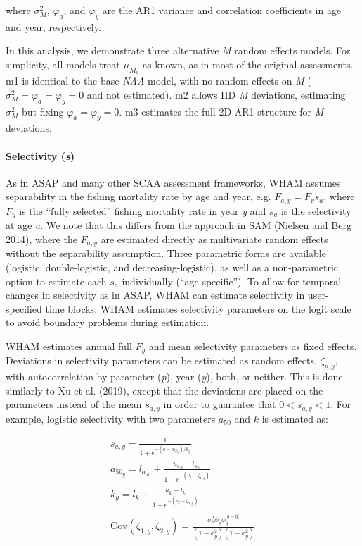 \documentclass[]{article}
\let\oldparagraph\paragraph
\renewcommand{\paragraph}[1]{\oldparagraph{#1}\mbox{}}
\begin{document}
where \(\sigma^2_M\), \(\varphi_a\), and \(\varphi_y\) are the AR1
variance and correlation coefficients in age and year, respectively.

In this analysis, we demonstrate three alternative \emph{M} random
effects models. For simplicity, all models treat \(\mu_{M_a}\) as known,
as in most of the original assessments. m1 is identical to the base
\emph{NAA} model, with no random effects on \emph{M}
(\(\sigma^2_M = \varphi_a = \varphi_y = 0\) and not estimated). m2
allows IID \emph{M} deviations, estimating \(\sigma^2_M\) but fixing
\(\varphi_a = \varphi_y = 0\). m3 estimates the full 2D AR1 structure
for \emph{M} deviations.

\hypertarget{selectivity-s}{%
\paragraph{\texorpdfstring{Selectivity
(\emph{s})}{Selectivity (s)}}\label{selectivity-s}}

As in ASAP and many other SCAA assessment frameworks, WHAM assumes
separability in the fishing mortality rate by age and year, e.g.
\(F_{a,y} = F_y s_a\), where \(F_y\) is the ``fully selected'' fishing
mortality rate in year \emph{y} and \(s_a\) is the selectivity at age
\emph{a}. We note that this differs from the approach in SAM (Nielsen
and Berg 2014), where the \(F_{a,y}\) are estimated directly as
multivariate random effects without the separability assumption. Three
parametric forms are available (logistic, double-logistic, and
decreasing-logistic), as well as a non-parametric option to estimate
each \(s_a\) individually (``age-specific''). To allow for temporal
changes in selectivity as in ASAP, WHAM can estimate selectivity in
user-specified time blocks. WHAM estimates selectivity parameters on the
logit scale to avoid boundary problems during estimation.

WHAM estimates annual full \(F_y\) and mean selectivity parameters as
fixed effects. Deviations in selectivity parameters can be estimated as
random effects, \(\zeta_{p,y}\), with autocorrelation by parameter
(\emph{p}), year (\emph{y}), both, or neither. This is done similarly to
Xu et al. (2019), except that the deviations are placed on the
parameters instead of the mean \(s_{a,y}\) in order to guarantee that
\(0 < s_{a,y} < 1\). For example, logistic selectivity with two
parameters \(a_{50}\) and \(k\) is estimated as:

\begin{equation}
  \begin{array}{cccc}
    s_{a,y} = \frac{1}{1 + e^{-(a - a_{{50}_y}) / k_y}} \\
    a_{{50}_y} = l_{a_{50}} + \frac{u_{a_{50}} - l_{a_{50}}}{1 + e^{-(\nu_1 + \zeta_{1,y})}} \\
    k_y = l_k + \frac{u_k - l_k}{1 + e^{-(\nu_2 + \zeta_{2,y})}} \\
    \text{Cov} \left( \zeta_{1,y}, \zeta_{2,\tilde{y}} \right) = \frac{\sigma^2_s \phi_p \phi^{|y-\tilde{y}|}_{y}}{\left(1-\phi^2_{p}\right) \left(1-\phi^2_{y}\right)}
  \end{array}
\end{equation}
\end{document}

